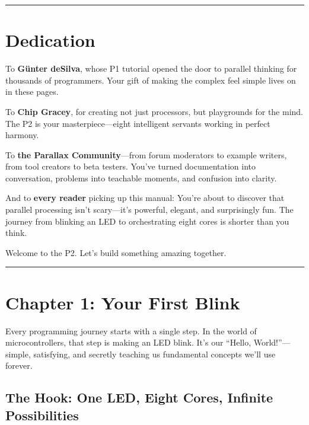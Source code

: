 \documentclass[11pt]{book}
\begin{document}
\begin{center}\rule{0.5\linewidth}{0.5pt}\end{center}

\hypertarget{dedication}{%
\section{Dedication}\label{dedication}}

To \textbf{Günter deSilva}, whose P1 tutorial opened the door to
parallel thinking for thousands of programmers. Your gift of making the
complex feel simple lives on in these pages.

To \textbf{Chip Gracey}, for creating not just processors, but
playgrounds for the mind. The P2 is your masterpiece---eight intelligent
servants working in perfect harmony.

To \textbf{the Parallax Community}---from forum moderators to example
writers, from tool creators to beta testers. You've turned documentation
into conversation, problems into teachable moments, and confusion into
clarity.

And to \textbf{every reader} picking up this manual: You're about to
discover that parallel processing isn't scary---it's powerful, elegant,
and surprisingly fun. The journey from blinking an LED to orchestrating
eight cores is shorter than you think.

Welcome to the P2. Let's build something amazing together.

\begin{center}\rule{0.5\linewidth}{0.5pt}\end{center}

\hypertarget{chapter-1-your-first-blink}{%
\section{Chapter 1: Your First Blink}\label{chapter-1-your-first-blink}}

Every programming journey starts with a single step. In the world of
microcontrollers, that step is making an LED blink. It's our ``Hello,
World!''---simple, satisfying, and secretly teaching us fundamental
concepts we'll use forever.

\hypertarget{the-hook-one-led-eight-cores-infinite-possibilities}{%
\subsection{The Hook: One LED, Eight Cores, Infinite
Possibilities}\label{the-hook-one-led-eight-cores-infinite-possibilities}}
\end{document}
